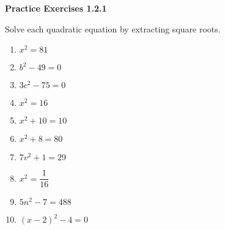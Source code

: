 \vspace{1ex}
\noindent\textbf{Practice Exercises 1.2.1}

\vspace{0.75ex}

Solve each quadratic equation by extracting square roots.
\begin{multicols}{3}
\begin{enumerate}[label = \color{blue}\arabic*. ]
  \item $ x^2 = 81 $
  \item $ b^2 - 49 = 0 $
  \item $ 3c^2 - 75 = 0 $
  \item $ x^2 = 16 $
  \item $ x^2 + 10 = 10 $
  \item $ x^2 + 8 = 80 $
  \item $ 7v^2 + 1 = 29 $
  \item $ x^2 = \dfrac{1}{16} $
  \item $ 5n^2 - 7 = 488 $
  \item $ (x - 2)^2 - 4 = 0 $
\end{enumerate}
\end{multicols}
				
				

